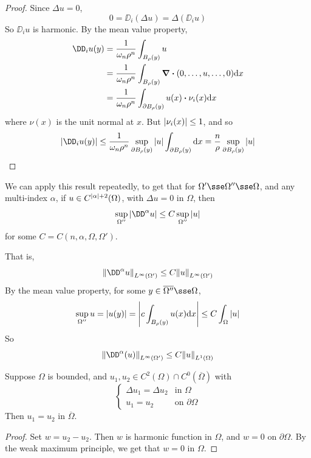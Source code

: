 \documentclass{article}
\begin{document}
\begin{proof}
    Since \(\Delta u = 0\),
    \[0 = \DD_i(\Delta u) = \Delta(\DD_i u)\]
    So \(\DD_i u\) is harmonic. By the mean value property,
    \begin{align*}
        \DD_i u(y) &= \frac{1}{\omega_n\rho^n}\int_{B_\rho(y)}u \\
        &= \frac{1}{\omega_n\rho^n}\int_{B_\rho(y)}\grad\vdot(0, \dots, u, \dots, 0) \dd x\\
        &= \frac{1}{\omega_n\rho^n}\int_{\partial B_\rho(y)}u(x)\vdot \nu_i(x)\dd x
    \end{align*}
    where \(\nu(x)\) is the unit normal at \(x\). But \(\abs{\nu_i(x)} \le 1\), and so
    \begin{align*}
        \abs{\DD_i u(y)} \le \frac{1}{\omega_n \rho^n}\sup_{\partial B_\rho(y)}\abs{u}\int_{\partial B_\rho(y)}\dd x = \frac{n}{\rho}\sup_{\partial B_\rho(y)}\abs{u}
    \end{align*}
\end{proof}

\begin{remark}
    We can apply this result repeatedly, to get that for \(\Omega' \sse \Omega'' \sse \Omega\), and any multi-index \(\alpha\), if \(u \in C^{\abs{\alpha} + 2}(\Omega)\), with \(\Delta u = 0\) in \(\Omega\), then
    \[\sup_{\Omega''}\abs{\DD^\alpha u} \le C \sup_{\Omega''}\abs{u}\]
    for some \(C = C(n, \alpha, \Omega, \Omega')\).

    That is,
    \[\norm{\DD^\alpha u}_{L^\infty(\Omega')} \le C\norm{u}_{L^\infty(\Omega')}\]
    By the mean value property, for some \(y \in \overline{\Omega''} \sse \Omega\),
    \[\sup_{\Omega''}u = \abs{u(y)} = \abs{c\int_{B_\rho(y)}u(x)\dd x} \le C\int_\Omega \abs{u}\]
    So
    \[\norm{\DD^\alpha(u)}_{L^\infty(\Omega')} \le C\norm{u}_{L^1(\Omega)}\]
\end{remark}

\begin{theorem}
     Suppose \(\Omega\) is bounded, and \(u_1, u_2 \in C^2(\Omega) \cap C^0(\overline{\Omega})\) with
    \[\begin{cases}
        \Delta u_1 = \Delta u_2 & \text{in }\Omega \\
        u_1 = u_2 &\text{on }\partial\Omega
    \end{cases}\] 
    Then \(u_1 = u_2\) in \(\overline\Omega\).
\end{theorem}

\begin{proof}
    Set \(w = u_2 - u_2\). Then \(w\) is harmonic function in \(\Omega\), and \(w = 0\) on \(\partial\Omega\). By the weak maximum principle, we get that \(w = 0\) in \(\Omega\).
\end{proof}
\end{document}
